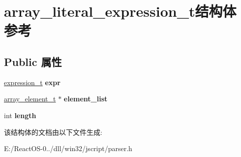 \hypertarget{structarray__literal__expression__t}{}\section{array\+\_\+literal\+\_\+expression\+\_\+t结构体 参考}
\label{structarray__literal__expression__t}
\subsection*{Public 属性}
\begin{DoxyCompactItemize}
\item 
\mbox{\label{structarray__literal__expression__t_a1ec072987ba23d6f68543128fc0443d7}} 
\hyperlink{struct__expression__t}{expression\+\_\+t} {\bfseries expr}
\item 
\mbox{\label{structarray__literal__expression__t_a6e9ea14f6d28ac2c0f05c8084792527c}} 
\hyperlink{struct__array__element__t}{array\+\_\+element\+\_\+t} $\ast$ {\bfseries element\+\_\+list}
\item 
\mbox{\label{structarray__literal__expression__t_a0feb99323c2511fe1fa227f0047380e5}} 
int {\bfseries length}
\end{DoxyCompactItemize}


该结构体的文档由以下文件生成\+:\begin{DoxyCompactItemize}
\item 
E\+:/\+React\+O\+S-\/0../dll/win32/jscript/parser.\+h\end{DoxyCompactItemize}
